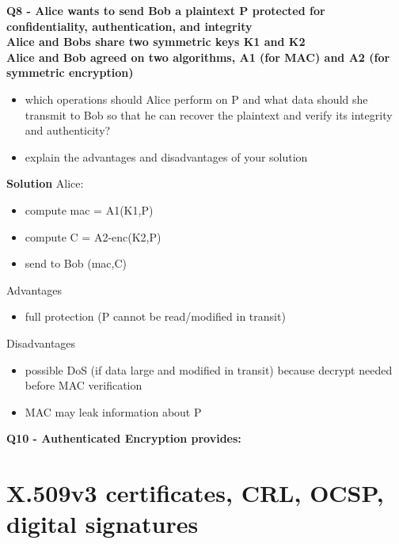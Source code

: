 \textbf{Q8 - Alice wants to send Bob a plaintext P protected for confidentiality, authentication, and integrity \\
Alice and Bobs share two symmetric keys K1 and K2 \\
Alice and Bob agreed on two algorithms, A1 (for MAC) and A2 (for symmetric encryption)}
\begin{itemize}
    \item which operations should Alice perform on P and what data
    should she transmit to Bob so that he can recover the plaintext
    and verify its integrity and authenticity?
    \item explain the advantages and disadvantages of your solution 
\end{itemize}
\textbf{Solution}
Alice:
\begin{itemize}
    \item compute mac = A1(K1,P)
    \item compute C = A2-enc(K2,P)
    \item send to Bob (mac,C)
\end{itemize}
Advantages
\begin{itemize}
    \item full protection (P cannot be read/modified in transit)
\end{itemize}
Disadvantages
\begin{itemize}
    \item possible DoS (if data large and modified in transit) because decrypt needed before MAC verification
    \item MAC may leak information about P
\end{itemize}

\textbf{Q10  - Authenticated Encryption provides:}




\section*{X.509v3 certificates, CRL, OCSP, digital signatures}

